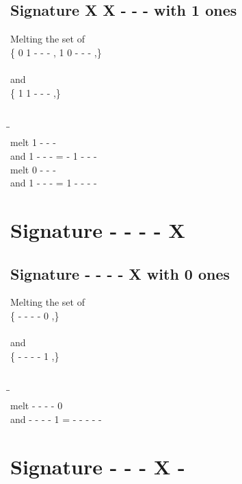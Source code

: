 \documentclass{article}
\begin{document}
\subsection{Signature X X - - - with 1 ones}
Melting the set of\\
\{ 0  1  -  -  - , 1  0  -  -  - ,\}\\\\
and\\
\{ 1  1  -  -  - ,\}\\\\
\begin{tabbing}
\hspace{3cm}\=\hspace{3cm}\=\hspace{3cm}\\[1cm]
melt  1  -  -  - \\
and  1  -  -  - \>
 =  -  1  -  -  - \\[1mm]
melt  0  -  -  - \\
and  1  -  -  - \>
 =  1  -  -  -  - \\[1mm]
\end{tabbing}
\newpage
\section{Signature - - - - X }
\subsection{Signature - - - - X with 0 ones}
Melting the set of\\
\{ -  -  -  -  0 ,\}\\\\
and\\
\{ -  -  -  -  1 ,\}\\\\
\begin{tabbing}
\hspace{3cm}\=\hspace{3cm}\=\hspace{3cm}\\[1cm]
melt\> -  -  -  -  0 \\
and\> -  -  -  -  1 \>
 =  -  -  -  -  - \\[1mm]
\end{tabbing}
\newpage
\section{Signature - - - X - }
\end{document}
